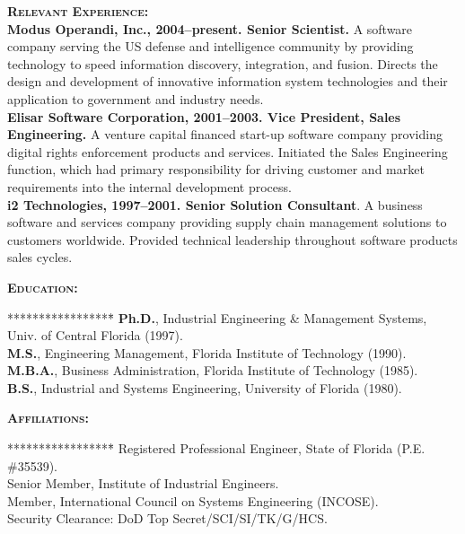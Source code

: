 \documentclass{sbir}
\begin{document}
{\begin{enumerate}
\end{enumerate}
\textbf{\textsc{Relevant Experience:}}~\\
{\bfseries Modus Operandi, Inc., 2004--present. Senior Scientist.} A software company serving the US defense and intelligence community by providing technology to speed information discovery, integration, and fusion. Directs the design and development of innovative information system technologies and their application to government and industry needs.~\\
{\bfseries Elisar Software Corporation, 2001--2003. Vice President, Sales Engineering.} A venture capital financed start-up software company providing digital rights enforcement products and services. Initiated the Sales Engineering function, which had primary responsibility for driving customer and market requirements into the internal development process.~\\
{\bfseries i2 Technologies, 1997--2001. Senior Solution Consultant}. A business software and services company providing supply chain management solutions to customers worldwide. Provided technical leadership throughout software products sales cycles.

\textbf{\textsc{Education:}}
\vspace{-30pt}
\begin{tabbing}*****************\=\kill
 \> {\bfseries Ph.D.}, Industrial Engineering \& Management Systems, Univ. of Central Florida (1997). \\
 \> {\bfseries M.S.}, Engineering Management, Florida Institute of Technology (1990). \\
 \> {\bfseries M.B.A.}, Business Administration, Florida Institute of Technology (1985). \\
 \> {\bfseries B.S.}, Industrial and Systems Engineering, University of Florida (1980).
\end{tabbing}

\textbf{\textsc{Affiliations:}}
\vspace{-30pt}
\begin{tabbing}*****************\=\kill
\> Registered Professional Engineer, State of Florida (P.E. \#35539). \\
\> Senior Member, Institute of Industrial Engineers. \\
\> Member, International Council on Systems Engineering (INCOSE). \\
\> Security Clearance: DoD Top Secret/SCI/SI/TK/G/HCS.
\end{tabbing}

}
\end{document}
